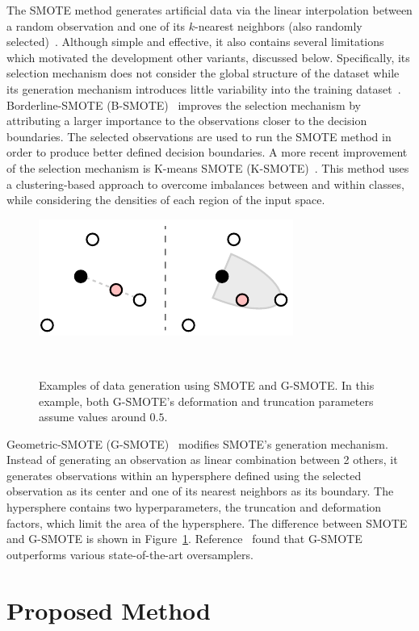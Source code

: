 \documentclass[parskip=full]{scrartcl}
\begin{document}
The SMOTE method generates artificial data via the linear interpolation
between a random observation and one of its $k$-nearest neighbors (also
randomly selected)~\cite{Chawla2002}. Although simple and effective, it also
contains several limitations which motivated the development other variants,
discussed below. Specifically, its selection mechanism does not consider the
global structure of the dataset while its generation mechanism introduces
little variability into the training dataset~\cite{Douzas2019}.
Borderline-SMOTE (B-SMOTE)~\cite{Han2005} improves the selection mechanism by
attributing a larger importance to the observations closer to the decision
boundaries. The selected observations are used to run the SMOTE method in
order to produce better defined decision boundaries. A more recent improvement
of the selection mechanism is K-means SMOTE (K-SMOTE)~\cite{Douzas2018}. This
method uses a clustering-based approach to overcome imbalances between and
within classes, while considering the densities of each region of the input
space.

\begin{figure}[H]
	\centering
	\includegraphics[width=.45\linewidth]{../analysis/smote_vs_gsmote}
    \caption{%
        Examples of data generation using SMOTE and G-SMOTE\@. In this
        example, both G-SMOTE's deformation and truncation parameters assume
        values around $0.5$.
    }~\label{fig:smote_vs_gsmote}
\end{figure}

Geometric-SMOTE (G-SMOTE)~\cite{Douzas2019} modifies SMOTE's generation
mechanism. Instead of generating an observation as linear combination between
2 others, it generates observations within an hypersphere defined using the
selected observation as its center and one of its nearest neighbors as its
boundary. The hypersphere contains two hyperparameters, the truncation and
deformation factors, which limit the area of the hypersphere. The difference
between SMOTE and G-SMOTE is shown in Figure~\ref{fig:smote_vs_gsmote}.
Reference~\cite{Douzas2019imbalanced} found that G-SMOTE outperforms various
state-of-the-art oversamplers.

\section{Proposed Method}~\label{sec:proposed_method}
\end{document}
